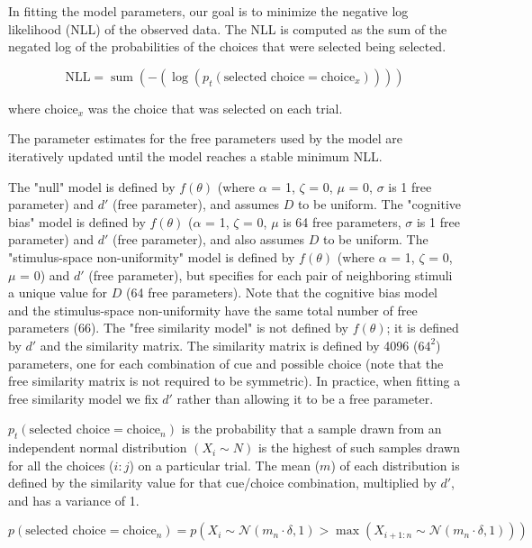 \documentclass[9pt,biorxiv,lineno,onehalfspacing]{lapreprint}
\begin{document}
\begin{refsection}
In fitting the model parameters, our goal is to minimize the negative log likelihood (NLL) of the observed data. 
The NLL is computed as the sum of the negated log of the probabilities of the choices that were selected being selected. 

\begin{equation}
    \text{NLL} = \operatorname{sum}\left(-\left(\log \left(p_t\left(\text {selected choice} = \text{choice}_x\right)\right)\right)\right)
\end{equation}

where $\text{choice}_x$ was the choice that was selected on each trial.

The parameter estimates for the free parameters used by the model are iteratively updated until the model reaches a stable minimum NLL. 

The "null" model is defined by $f(\theta)$ (where $\alpha$ = 1, $\zeta$ = 0, $\mu$ = 0, $\sigma$ is 1 free parameter) and $d'$ (free parameter), and assumes $D$ to be uniform. 
The "cognitive bias" model is defined by $f(\theta)$ ($\alpha$ = 1, $\zeta$ = 0, $\mu$ is 64 free parameters, $\sigma$ is 1 free parameter) and $d'$ (free parameter), and also assumes $D$ to be uniform. 
The "stimulus-space non-uniformity" model is defined by $f(\theta)$ (where $\alpha$ = 1, $\zeta$ = 0, $\mu$ = 0) and $d'$ (free parameter), but specifies for each pair of neighboring stimuli a unique value for $D$ (64 free parameters). 
Note that the cognitive bias model and the stimulus-space non-uniformity have the same total number of free parameters (66). 
The "free similarity model" is not defined by $f(\theta)$; it is defined by $d'$ and the similarity matrix. 
The similarity matrix is defined by 4096 ($64^2$) parameters, one for each combination of cue and possible choice (note that the free similarity matrix is not required to be symmetric).
In practice, when fitting a free similarity model we fix $d'$ rather than allowing it to be a free parameter.

$p_t(\text{selected choice} = \text{choice}_n)$ is the probability that a sample drawn from an independent normal distribution $(X_i \sim N)$ is the highest of such samples drawn for all the choices ($i:j$) on a particular trial. 
The mean ($m$) of each distribution is defined by the similarity value for that cue/choice combination, multiplied by $d'$, and has a variance of 1.

\begin{equation}
    p\left(\text{selected choice} = \text{choice}_n\right) = 
    p\left(X_i \sim \mathcal{N}\left(m_n \cdot \delta, 1\right)
    >\max 
    \left(X_{i+1: n} \sim \mathcal{N}\left(m_n \cdot \delta, 1\right)\right)\right)
\end{equation}


\end{refsection}
\end{document}
